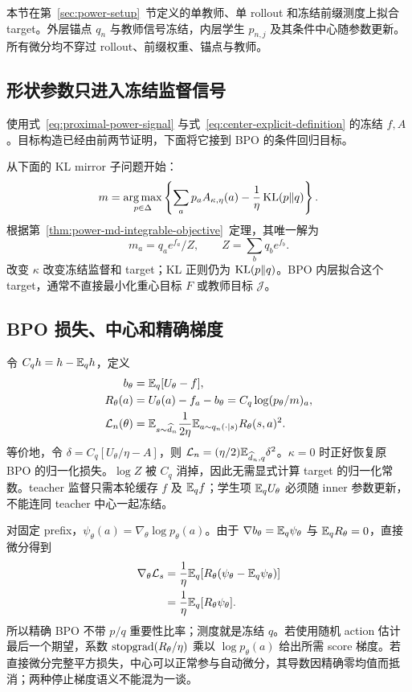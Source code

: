 \label{sec:power-bpo-algorithm}

本节在第~\ref{sec:power-setup}~节定义的单教师、单 rollout 和冻结前缀测度上拟合 target。外层锚点 $q_n$ 与教师信号冻结，内层学生 $p_{n,j}$ 及其条件中心随参数更新。所有微分均不穿过 rollout、前缀权重、锚点与教师。

\subsection{形状参数只进入冻结监督信号}

使用式~\eqref{eq:proximal-power-signal} 与式~\eqref{eq:center-explicit-definition} 的冻结 $f,A$。目标构造已经由前两节证明，下面将它接到 BPO 的条件回归目标。

从下面的 KL mirror 子问题开始：
\begin{equation}
 m=\operatorname*{arg\,max}_{p\in\Delta}
 \left\{\sum_a p_a A_{\kappa,\eta}(a)
       -\frac1\eta\operatorname{KL}(p\Vert q)\right\}.
 \label{eq:power-bpo-mirror-subproblem}
\end{equation}
根据第~\ref{thm:power-md-integrable-objective}~定理，其唯一解为
\begin{equation}
 m_a=q_ae^{f_a}/Z,\qquad Z=\sum_bq_be^{f_b}.
 \label{eq:power-bpo-explicit-target}
\end{equation}
改变 $\kappa$ 改变冻结监督和 target；KL 正则仍为 $\operatorname{KL}(p\Vert q)$。BPO 内层拟合这个 target，通常不直接最小化重心目标 $F$ 或教师目标 $\mathcal J$。

\subsection{BPO 损失、中心和精确梯度}

令 $C_qh=h-\mathbb E_qh$，定义
\begin{align}
 b_\theta&=\mathbb E_q[U_\theta-f],\\
 R_\theta(a)&=U_\theta(a)-f_a-b_\theta
            =C_q\log(p_\theta/m)_a,\\
 \mathcal L_n(\theta)
 &=\mathbb E_{s\sim\widehat d_n}\frac1{2\eta}
     \mathbb E_{a\sim q_n(\cdot\mid s)}R_\theta(s,a)^2.
 \label{eq:power-bpo-population-loss}
\end{align}
等价地，令 $\delta=C_q[U_\theta/\eta-A]$，则 $\mathcal L_n=(\eta/2)\mathbb E_{\widehat d_n,q}\delta^2$。$\kappa=0$ 时正好恢复原 BPO 的归一化损失。$\log Z$ 被 $C_q$ 消掉，因此无需显式计算 target 的归一化常数。teacher 监督只需本轮缓存 $f$ 及 $\mathbb E_qf$；学生项 $\mathbb E_qU_\theta$ 必须随 inner 参数更新，不能连同 teacher 中心一起冻结。

对固定 prefix，$\psi_\theta(a)=\nabla_\theta\log p_\theta(a)$。由于 $\nabla b_\theta=\mathbb E_q\psi_\theta$ 与 $\mathbb E_qR_\theta=0$，直接微分得到
\begin{align}
 \nabla_\theta\mathcal L_s
 &=\frac1\eta\mathbb E_q[R_\theta(\psi_\theta-\mathbb E_q\psi_\theta)]\\
 &=\frac1\eta\mathbb E_q[R_\theta\psi_\theta].
 \label{eq:power-bpo-gradient}
\end{align}
所以精确 BPO 不带 $p/q$ 重要性比率；测度就是冻结 $q$。若使用随机 action 估计最后一个期望，系数 $\operatorname{stopgrad}(R_\theta/\eta)$ 乘以 $\log p_\theta(a)$ 给出所需 score 梯度。若直接微分完整平方损失，中心可以正常参与自动微分，其导数因精确零均值而抵消；两种停止梯度语义不能混为一谈。

